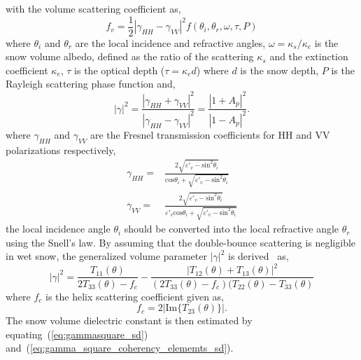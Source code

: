 with the volume scattering coefficient as,
\begin{equation}
	f_{v} = \frac{1}{2}|\gamma_{HH}-\gamma_{VV}|^{2}f(\theta_{i},\theta_{r},\omega,\tau,P)
	\label{eq:fv_sw}
\end{equation}
where $\theta_{i}$ and $\theta_{r}$ are the local incidence and refractive angles, $\omega=\kappa_{s}/\kappa_{e}$ is the snow volume albedo, defined as the ratio of the scattering $\kappa_{s}$ and the extinction coefficient $\kappa_{e}$, $\tau$ is the optical depth ($\tau=\kappa_{e}d$) where $d$ is the snow depth, $P$ is the Rayleigh scattering phase function and,
\begin{equation}
	|\gamma|^2 = \frac{|\gamma_{HH} + \gamma_{VV}|^2}{|\gamma_{HH} - \gamma_{VV}|^2} = \frac{|1 + A_{p}|^2}{|1 - A_{p}|^2}.
	\label{eq:gammasquare_sd}
\end{equation}
where $\gamma_{HH}$ and $\gamma_{VV}$ are the Fresnel transmission coefficients for HH and VV polarizations respectively,
\begin{subequations}
	\begin{align}
		\gamma_{HH} =& \frac{2\sqrt{\varepsilon{'}_{v} - \mbox{sin}^2\theta_{i}}}{\mbox{cos}\theta_{i} + \sqrt{\varepsilon{'}_{v} - \mbox{sin}^2\theta_{i}}} \\
		\gamma_{VV} =& \frac{2\sqrt{\varepsilon{'}_{v} - \mbox{sin}^2\theta_{i}}}{\varepsilon{'}_{v}\mbox{cos}\theta_{i} + \sqrt{\varepsilon{'}_{v} - \mbox{sin}^2\theta_{i}}}
	\end{align}
	\label{eq:fresnel_trans_coefficients_sd}
\end{subequations}
the local incidence angle $\theta_{i}$ should be converted into the local refractive angle $\theta_{r}$ using the Snell's law.
By assuming that the double-bounce scattering is negligible in wet snow, the generalized volume parameter $|\gamma|^2$ is derived~\cite{singh2013b} as,
\begin{equation}
	|\gamma|^2 = \frac{T_{11}(\theta)}{2T_{33}(\theta)-f_c} - \frac{|T_{12}(\theta)+T_{13}(\theta)|^{2}}{(2T_{33}(\theta)-f_{c})(T_{22}(\theta)-T_{33}(\theta)}
	\label{eq:gamma_square_coherency_elememts_sd}
\end{equation}
where $f_{c}$ is the helix scattering coefficient given as,
\begin{equation}
	f_{c}=2|\mbox{Im}\{T_{23}(\theta)\}|.
	\label{eq:helix_scattering_coefficient_sd}
\end{equation}
The snow volume dielectric constant is then estimated by equating~(\ref{eq:gammasquare_sd}) and~(\ref{eq:gamma_square_coherency_elememts_sd}).
 
